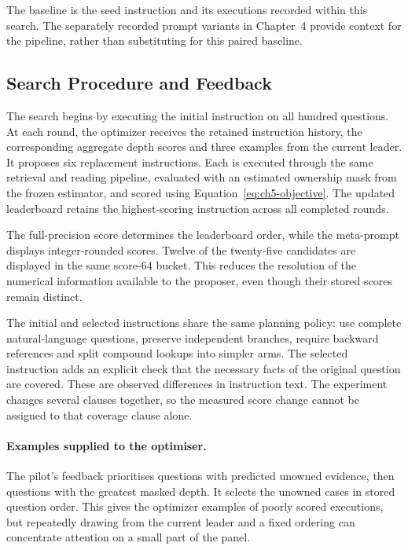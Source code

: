 The baseline is the seed instruction and its executions recorded within this
search. The separately recorded prompt variants in Chapter~4 provide context
for the pipeline, rather than substituting for this paired baseline.

\subsection{Search Procedure and Feedback}

The search begins by executing the initial instruction on all hundred
questions. At each round, the optimizer receives the retained instruction
history, the corresponding aggregate depth scores and three examples from
the current leader. It proposes six replacement instructions. Each is
executed through the same retrieval and reading pipeline, evaluated with an
estimated ownership mask from the frozen estimator, and scored using Equation~\ref{eq:ch5-objective}. The updated
leaderboard retains the highest-scoring instruction across all completed
rounds.

The full-precision score determines the leaderboard order, while the
meta-prompt displays integer-rounded scores. Twelve of the twenty-five
candidates are displayed in the same score-$64$ bucket. This reduces the
resolution of the numerical information available to the proposer, even
though their stored scores remain distinct.

The initial and selected instructions share the same planning policy: use
complete natural-language questions, preserve independent branches, require
backward references and split compound lookups into simpler arms. The selected
instruction adds an explicit check that the necessary facts of the original
question are covered. These are observed differences in instruction text.
The experiment changes several clauses together, so the measured score change
cannot be assigned to that coverage clause alone.

\paragraph{Examples supplied to the optimiser.}
The pilot's feedback prioritises questions with predicted unowned
evidence, then questions with the greatest masked depth. It selects the
unowned cases in stored question order. This gives the optimizer examples of
poorly scored executions, but repeatedly drawing from the current leader and
a fixed ordering can concentrate attention on a small part of the panel.

